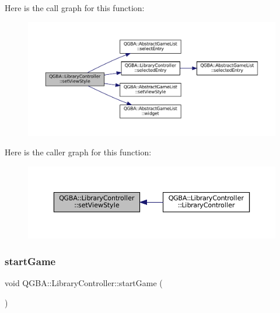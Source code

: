 Here is the call graph for this function\+:
\nopagebreak
\begin{figure}[H]
\begin{center}
\leavevmode
\includegraphics[width=350pt]{class_q_g_b_a_1_1_library_controller_a03b3f54bcf12e4be753ccceef5ee0937_cgraph}
\end{center}
\end{figure}
Here is the caller graph for this function\+:
\nopagebreak
\begin{figure}[H]
\begin{center}
\leavevmode
\includegraphics[width=350pt]{class_q_g_b_a_1_1_library_controller_a03b3f54bcf12e4be753ccceef5ee0937_icgraph}
\end{center}
\end{figure}
\mbox{\label{class_q_g_b_a_1_1_library_controller_a6c95f8fb4c265787962284aa7835c899}} 
\subsubsection{\texorpdfstring{start\+Game}{startGame}}
{\footnotesize\ttfamily void Q\+G\+B\+A\+::\+Library\+Controller\+::start\+Game (\begin{DoxyParamCaption}{ }\end{DoxyParamCaption})\hspace{0.3cm}{\ttfamily [signal]}}

